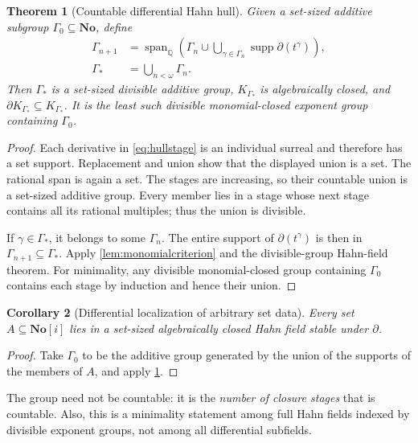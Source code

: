 \documentclass[11pt,a4paper]{article}
\newtheorem{theorem}{Theorem}[section]
\newtheorem{corollary}[theorem]{Corollary}
\theoremstyle{definition}
\newcommand{\No}{\mathbf{No}}
\newcommand{\SC}{\mathbf{No}[i]}
\newcommand{\Q}{\mathbb Q}
\newcommand{\D}{\partial}
\newcommand{\supp}{\operatorname{supp}}
\newcommand{\Span}{\operatorname{span}}
\numberwithin{equation}{section}
\begin{document}
\begin{theorem}[Countable differential Hahn hull]\label{thm:hull}
Given a set-sized additive subgroup $\Gamma_0\subseteq\No$, define
\begin{align}
 \Gamma_{n+1}
 &=\Span_\Q\!\left(\Gamma_n\cup
        \bigcup_{\gamma\in\Gamma_n}\supp\D(t^\gamma)\right),
       \label{eq:hullstage}\\
 \Gamma_*&=\bigcup_{n<\omega}\Gamma_n.
       \label{eq:hullunion}
\end{align}
Then $\Gamma_*$ is a set-sized divisible additive group,
$K_{\Gamma_*}$ is algebraically closed, and
$\D K_{\Gamma_*}\subseteq K_{\Gamma_*}$. It is the least such divisible
monomial-closed exponent group containing $\Gamma_0$.
\end{theorem}
\begin{proof}
Each derivative in \eqref{eq:hullstage} is an individual surreal and
therefore has a set support. Replacement and union show that the displayed
union is a set. The rational span is again a set. The stages are increasing,
so their countable union is a set-sized additive group. Every member lies
in a stage whose next stage contains all its rational multiples; thus the
union is divisible.

If $\gamma\in\Gamma_*$, it belongs to some $\Gamma_n$. The entire support
of $\D(t^\gamma)$ is then in $\Gamma_{n+1}\subseteq\Gamma_*$. Apply
\cref{lem:monomialcriterion} and the divisible-group Hahn-field theorem.
For minimality, any divisible monomial-closed group containing $\Gamma_0$
contains each stage by induction and hence their union.
\end{proof}

\begin{corollary}[Differential localization of arbitrary set data]
Every set $A\subseteq\SC$ lies in a set-sized algebraically closed
Hahn field stable under $\D$.
\end{corollary}
\begin{proof}
Take $\Gamma_0$ to be the additive group generated by the union of the
supports of the members of $A$, and apply \cref{thm:hull}.
\end{proof}
The group need not be countable: it is the \emph{number of closure stages}
that is countable. Also, this is a minimality statement among full Hahn
fields indexed by divisible exponent groups, not among all differential
subfields.
\end{document}
